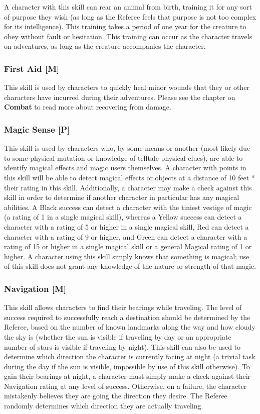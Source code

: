 \documentclass[oneside]{book}
\begin{document}
\begin{multicols}{2}
A character with this skill can rear an animal from birth, training it for any sort of purpose they wish (as long as the Referee feels that purpose is not too complex for its intelligence). This training takes a period of one year for the creature to obey without fault or hesitation. This training can occur as the character travels on adventures, as long as the creature accompanies the character. 

\subsubsection{First Aid [M]}
This skill is used by characters to quickly heal minor wounds that they or other characters have incurred during their adventures. Please see the chapter on \textbf{Combat} to read more about recovering from damage.

\subsubsection{Magic Sense [P]}
This skill is used by characters who, by some means or another (most likely due to some physical mutation or knowledge of telltale physical clues), are able to identify magical effects and magic users themselves. A character with points in this skill will be able to detect magical effects or objects at a distance of 10 feet * their rating in this skill. Additionally, a character may make a check against this skill in order to determine if another character in particular has any magical abilities. A Black success can detect a character with the tiniest vestige of magic (a rating of 1 in a single magical skill), whereas a Yellow success can detect a character with a rating of 5 or higher in a single magical skill, Red can detect a character with a rating of 9 or higher, and Green  can detect a character with a rating of 15 or higher in a single magical skill or a general Magical rating of 1 or higher. A character using this skill simply knows that something is magical; use of this skill does not grant any knowledge of the nature or strength of that magic. 

\subsubsection{Navigation [M]}
This skill allows characters to find their bearings while traveling. The level of success required to successfully reach a destination should be determined by the Referee,  based on the number of known landmarks along the way and how cloudy the sky is (whether the sun is visible if traveling by day or an appropriate number of stars is visible if traveling by night). This skill can also be used to determine which direction the character is currently facing at night (a trivial task during the day if the sun is visible, impossible by use of this skill otherwise). To gain their bearings at night, a character must simply make a check against their Navigation rating at any level of success. Otherwise, on a failure, the character mistakenly believes they are going the direction they desire. The Referee randomly determines which direction they are actually traveling.


\end{multicols}
\end{document}
